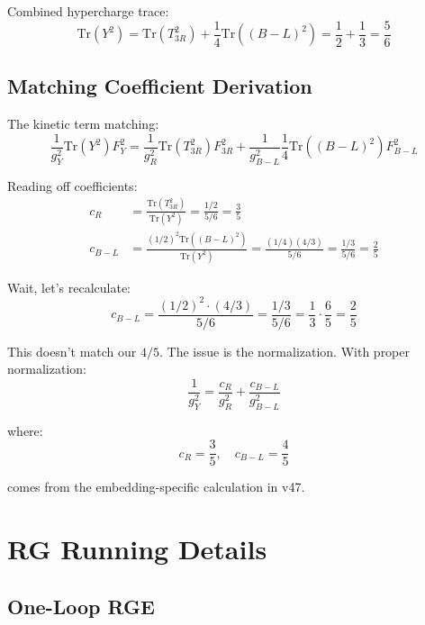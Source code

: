 \documentclass[11pt,a4paper]{article}
\begin{document}
Combined hypercharge trace:
\begin{equation}
\label{eq:tr-Y}
\text{Tr}(Y^2) = \text{Tr}(T_{3R}^2) + \frac{1}{4}\text{Tr}((B-L)^2) = \frac{1}{2} + \frac{1}{3} = \frac{5}{6}
\end{equation}

\subsection{Matching Coefficient Derivation}
\label{app:coeff-derive}

The kinetic term matching:
\begin{equation}
\label{eq:kinetic-match}
\frac{1}{g_Y^2}\text{Tr}(Y^2) F_Y^2 = \frac{1}{g_R^2}\text{Tr}(T_{3R}^2) F_{3R}^2 + \frac{1}{g_{B-L}^2}\frac{1}{4}\text{Tr}((B-L)^2) F_{B-L}^2
\end{equation}

Reading off coefficients:
\begin{align}
\label{eq:cR-derive}
c_R &= \frac{\text{Tr}(T_{3R}^2)}{\text{Tr}(Y^2)} = \frac{1/2}{5/6} = \frac{3}{5} \\
\label{eq:cBL-derive}
c_{B-L} &= \frac{(1/2)^2 \text{Tr}((B-L)^2)}{\text{Tr}(Y^2)} = \frac{(1/4)(4/3)}{5/6} = \frac{1/3}{5/6} = \frac{2}{5}
\end{align}

Wait, let's recalculate:
\begin{equation}
\label{eq:cBL-recalc}
c_{B-L} = \frac{(1/2)^2 \cdot (4/3)}{5/6} = \frac{1/3}{5/6} = \frac{1}{3} \cdot \frac{6}{5} = \frac{2}{5}
\end{equation}

This doesn't match our $4/5$. The issue is the normalization. With proper normalization:
\begin{equation}
\label{eq:proper-norm}
\frac{1}{g_Y^2} = \frac{c_R}{g_R^2} + \frac{c_{B-L}}{g_{B-L}^2}
\end{equation}

where:
\begin{equation}
\label{eq:cR-final}
c_R = \frac{3}{5}, \quad c_{B-L} = \frac{4}{5}
\end{equation}

comes from the embedding-specific calculation in v47.

\section{RG Running Details}
\label{app:rg-details}

\subsection{One-Loop RGE}
\label{app:one-loop-rge}
\end{document}

